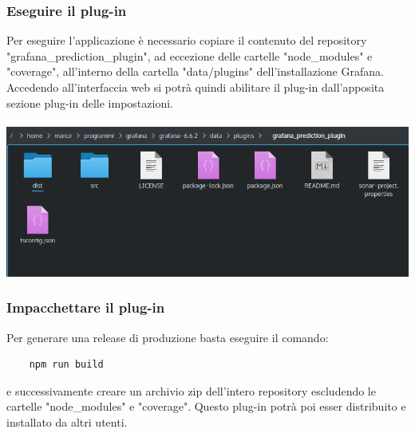 \subsubsection{Eseguire il plug-in}%
Per eseguire l'applicazione è necessario copiare il contenuto del repository "grafana\_prediction\_plugin", ad eccezione delle cartelle "node\_modules" e "coverage", all'interno della cartella "data/plugins" dell'installazione Grafana\glo. Accedendo all'interfaccia web si potrà quindi abilitare il plug-in dall'apposita sezione plug-in delle impostazioni.
\\
\\
\includegraphics[width=\textwidth,height=\textheight,keepaspectratio]{img/plugin-directory.png}

\subsubsection{Impacchettare il plug-in}%
Per generare una release di produzione basta eseguire il comando:
\begin{verbatim}
	npm run build	
\end{verbatim}
e successivamente creare un archivio zip dell'intero repository escludendo le cartelle "node\_modules" e "coverage". Questo plug-in potrà poi esser distribuito e installato da altri utenti. 
